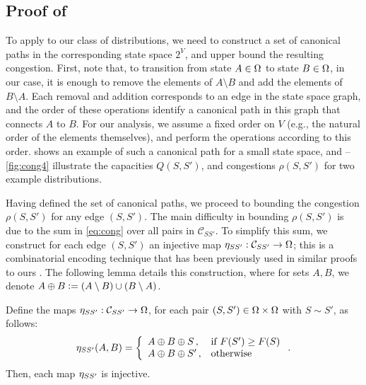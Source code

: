 \subsection{Proof of }
To apply  to our class of distributions, we need to construct a set of canonical paths in the corresponding state space $2^V$, and upper bound the resulting congestion.
First, note that, to transition from state $A \in \ss$ to state $B \in \ss$, in our case, it is enough to remove the elements of $A \setminus B$ and add the elements of $B \setminus A$.
Each removal and addition corresponds to an edge in the state space graph, and the order of these operations identify a canonical path in this graph that connects $A$ to $B$.
For our analysis, we assume a fixed order on $V$ (e.g., the natural order of the elements themselves), and perform the operations according to this order.
 shows an example of such a canonical path for a small state space, and --\ref{fig:cong4} illustrate the capacities $Q(S, S')$, and congestions $\rho(S, S')$ for two example distributions.

Having defined the set of canonical paths, we proceed to bounding the congestion $\rho(S, S')$ for any edge $(S, S')$.
The main difficulty in bounding $\rho(S, S')$ is due to the sum in \eqref{eq:cong} over all pairs in $\mathcal{C}_{SS'}$.
To simplify this sum, we construct for each edge $(S, S')$ an injective map $\ess : \mathcal{C}_{SS'} \to \ss$; this is a combinatorial encoding technique that has been previously used in similar proofs to ours \citep{jerrum03}.
The following lemma details this construction, where for sets $A, B$, we denote $A \oplus B \defeq (A \setminus B)\cup(B \setminus A)$.

\begin{lemma} \label{lem:inj}
Define the maps $\ess : \mathcal{C}_{SS'} \to \ss$, for each pair $(S, S') \in \ss \times \ss$ with $S \sim S'$, as follows:
\begin{align*}
  \ess(A, B) = \twopartdefo{A \oplus B \oplus S}{F(S') \geq F(S)}{A \oplus B \oplus S'}.
\end{align*}
Then, each map $\ess$ is injective.
\end{lemma}

